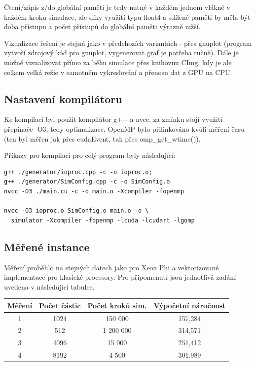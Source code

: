 \documentclass[12pt]{article}
\begin{document}
Čtení/zápis z/do globální paměti je tedy nutný v každém jednom vlákně v každém kroku simulace,
ale díky využití typu float4 a sdílené paměti by měla být doba přístupu a počet přístupů do globální paměti výrazně nižší.

Vizualizace řešení je stejná jako v předchozích variantách
- přes gnuplot (program vytvoří zdrojový kód pro gnuplot, vygenerovat graf je potřeba ručně).
Dále je možné vizualizovat přímo za běhu simulace přes knihovnu CImg, kdy je ale celkem velká režie v samotném vykreslování a přenosu dat z GPU na CPU.

\subsection{Nastavení kompilátoru}
Ke kompilaci byl použit kompilátor g++ a nvcc. za zmínku stojí využití přepínače -O3, tedy optimalizace.
OpenMP bylo přilinkováno kvůli měření času (ten byl měřen jak přes cudaEvent, tak přes omp\_get\_wtime()).

Příkazy pro kompilaci pro celý program byly následující:
\begin{verbatim}
g++ ./generator/ioproc.cpp -c -o ioproc.o;
g++ ./generator/SimConfig.cpp -c -o SimConfig.o
nvcc -O3 ./main.cu -c -o main.o -Xcompiler -fopenmp

nvcc -O3 ioproc.o SimConfig.o main.o -o \
  simulator -Xcompiler -fopenmp -lcuda -lcudart -lgomp
\end{verbatim}

\subsection{Měřené instance}
Měření proběhlo na stejných datech jako pro Xeon Phi a vektorizované implementace pro klasické procesory.
Pro připomenutí jsou jednotlivá zadání uvedena v následující tabulce.

\begin{center}
\begin{tabular}{c | c | c | c}
\textbf{Měření} & \textbf{Počet částic} & \textbf{Počet kroků sim.} & \textbf{Výpočetní náročnost} \\ \hline \hline
1 & 1024 & 150 000 & 157,284 \\ \hline
2 & 512 & 1 200 000 & 314,571 \\ \hline
3 & 4096 & 15 000 & 251,412 \\ \hline
4 & 8192 & 4 500 & 301.989 \\ \hline
\end{tabular}
\end{center}
\end{document}
